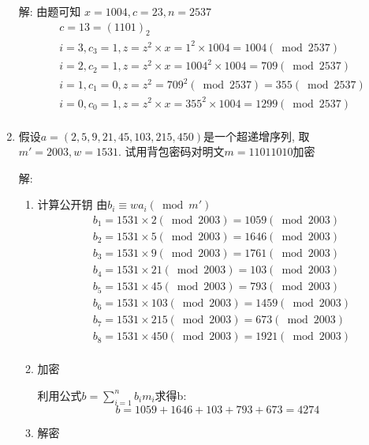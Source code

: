 \documentclass[UTF8]{ctexart}
\begin{document}
\begin{enumerate}
    解: 由题可知 $x=1004, c=23, n=2537$
    $$
    \begin{aligned}
      &c=13=(1101)_2\\
      &i=3, c_3=1, z=z^2\times x=1^2\times 1004=1004(\bmod 2537)\\
      &i=2, c_2=1, z=z^2\times x=1004^2\times 1004=709(\bmod 2537)\\
      &i=1, c_1=0, z=z^2=709^2(\bmod 2537)=355(\bmod 2537)\\
      &i=0, c_0=1, z=z^2\times x=355^2\times 1004=1299(\bmod 2537)\\
    \end{aligned}
    $$
    \item 假设$a=(2,5,9,21,45,103,215,450)$是一个超递增序列, 取$m'=2003, w=1531$. 试用背包密码对明文$m=11011010$加密

    解:

    \begin{enumerate}
      \item 计算公开钥
      由$b_i\equiv wa_i(\bmod m')$
      $$
      \begin{aligned}
        &b_1=1531\times 2(\bmod 2003)=1059(\bmod 2003)\\
        &b_2=1531\times 5(\bmod 2003)=1646(\bmod 2003)\\
        &b_3=1531\times 9(\bmod 2003)=1761(\bmod 2003)\\
        &b_4=1531\times 21(\bmod 2003)=103(\bmod 2003)\\
        &b_5=1531\times 45(\bmod 2003)=793(\bmod 2003)\\
        &b_6=1531\times 103(\bmod 2003)=1459(\bmod 2003)\\
        &b_7=1531\times 215(\bmod 2003)=673(\bmod 2003)\\
        &b_8=1531\times 450(\bmod 2003)=1921(\bmod 2003)\\
      \end{aligned}
      $$
      \item 加密

      利用公式$b=\sum\limits_{i=1}^n b_im_i$求得b:
      $$b=1059+1646+103+793+673=4274$$
      \item 解密
    \end{enumerate}


\end{enumerate}
\end{document}
